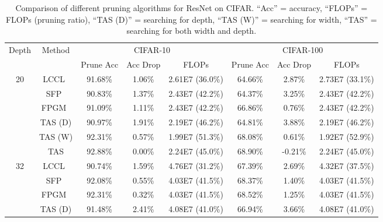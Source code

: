 \documentclass{article}
\def\NAME{{TAS}}
\begin{document}
\begin{table}[t]
  \caption{
  Comparison of different pruning algorithms for ResNet on CIFAR.
  ``Acc'' = accuracy, ``FLOPs'' = FLOPs (pruning ratio), ``TAS (D)'' = searching for depth, ``TAS (W)'' = searching for width, ``TAS'' = searching for both width and depth.
  }
  \vspace{2mm}
  \centering
  \setlength{\tabcolsep}{2pt}
  \begin{tabular}{c c c c c c c c}
    \toprule
\multirow{2}{*}{Depth}  & \multirow{2}{*}{Method} &       \multicolumn{3}{c}{CIFAR-10}       & \multicolumn{3}{c}{CIFAR-100}            \\
                          &                         & Prune Acc  & Acc Drop  &   FLOPs          & Prune Acc   & Acc Drop  &  FLOPs           \\
    \midrule
\multirow{6}{*}{20}
                          &LCCL~\cite{dong2017more} &  91.68\%   & 1.06\%    & 2.61E7 (36.0\%) &  64.66\%   &  2.87\%   & 2.73E7 (33.1\%)  \\
                          & SFP~\cite{he2018soft}   &  90.83\%   & 1.37\%    & 2.43E7 (42.2\%) &  64.37\%   &  3.25\%   & 2.43E7 (42.2\%)  \\
                          &FPGM~\cite{he2019pruning}&  91.09\%   & 1.11\%    & 2.43E7 (42.2\%) &  66.86\%   &  0.76\%   & 2.43E7 (42.2\%)  \\\cmidrule[0.5pt](lr){2-8}
                          & {\NAME} (D)             &  90.97\%   & 1.91\%    & 2.19E7 (46.2\%) &  64.81\%   &  3.88\%   & 2.19E7 (46.2\%)  \\
                          & {\NAME} (W)             &  92.31\%   & 0.57\%    & 1.99E7 (51.3\%) &  68.08\%   &  0.61\%   & 1.92E7 (52.9\%)  \\
                          & {\NAME}                 &  92.88\%   & 0.00\%    & 2.24E7 (45.0\%) &  68.90\%   &  -0.21\%  & 2.24E7 (45.0\%)  \\
    \midrule
\multirow{6}{*}{32}
                          &LCCL~\cite{dong2017more} &  90.74\%   & 1.59\%    & 4.76E7 (31.2\%) & 67.39\%    &  2.69\%   & 4.32E7 (37.5\%)  \\
                          & SFP~\cite{he2018soft}   &  92.08\%   & 0.55\%    & 4.03E7 (41.5\%) & 68.37\%    &  1.40\%   & 4.03E7 (41.5\%)  \\
                          &FPGM~\cite{he2019pruning}&  92.31\%   & 0.32\%    & 4.03E7 (41.5\%) & 68.52\%    &  1.25\%   & 4.03E7 (41.5\%)  \\\cmidrule[0.5pt](lr){2-8} & {\NAME} (D)             &  91.48\%   & 2.41\%    & 4.08E7 (41.0\%) & 66.94\%    &  3.66\%   & 4.08E7 (41.0\%)  \\

\end{tabular}
\end{table}
\end{document}
